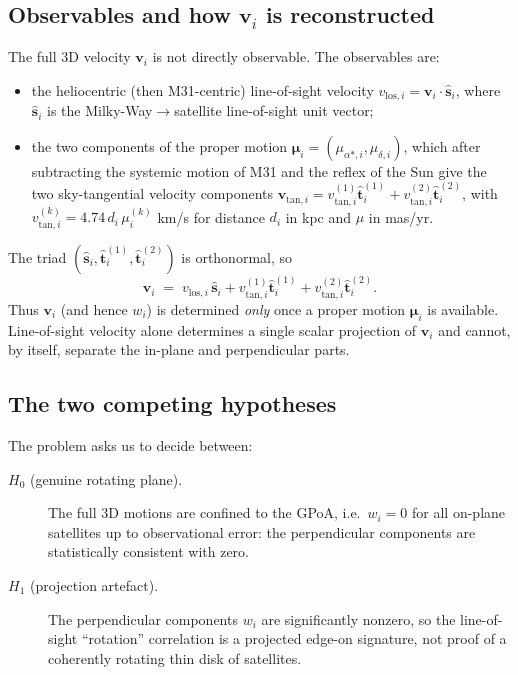 \documentclass{amsart}
\theoremstyle{definition}
\begin{document}
\subsection{Observables and how $\bm v_i$ is reconstructed}
The full 3D velocity $\bm v_i$ is not directly observable. The observables are:
\begin{itemize}
  \item the heliocentric (then M31-centric) line-of-sight velocity
        $v_{\mathrm{los},i}=\bm v_i\cdot\hat{\bm s}_i$, where $\hat{\bm s}_i$
        is the Milky-Way$\to$satellite line-of-sight unit vector;
  \item the two components of the proper motion
        $\bm\mu_i=(\mu_{\alpha*,i},\mu_{\delta,i})$, which after subtracting
        the systemic motion of M31 and the reflex of the Sun give the two
        sky-tangential velocity components
        $\bm v_{\mathrm{tan},i}=v_{\mathrm{tan},i}^{(1)}\hat{\bm t}_i^{(1)}
        + v_{\mathrm{tan},i}^{(2)}\hat{\bm t}_i^{(2)}$, with
        $v_{\mathrm{tan},i}^{(k)} = 4.74\,d_i\,\mu^{(k)}_i$ km/s for distance
        $d_i$ in kpc and $\mu$ in mas/yr.
\end{itemize}
The triad $(\hat{\bm s}_i,\hat{\bm t}_i^{(1)},\hat{\bm t}_i^{(2)})$ is
orthonormal, so
\begin{equation}\label{eq:v3d}
  \bm v_i \;=\; v_{\mathrm{los},i}\,\hat{\bm s}_i
   + v_{\mathrm{tan},i}^{(1)}\hat{\bm t}_i^{(1)}
   + v_{\mathrm{tan},i}^{(2)}\hat{\bm t}_i^{(2)} .
\end{equation}
Thus $\bm v_i$ (and hence $w_i$) is determined \emph{only} once a proper
motion $\bm\mu_i$ is available. Line-of-sight velocity alone determines a
single scalar projection of $\bm v_i$ and cannot, by itself, separate the
in-plane and perpendicular parts.

\subsection{The two competing hypotheses}
The problem asks us to decide between:
\begin{description}
\item[$H_0$ (genuine rotating plane).] The full 3D motions are confined to
  the GPoA, i.e.\ $w_i=0$ for all on-plane satellites up to observational
  error: the perpendicular components are statistically consistent with zero.
\item[$H_1$ (projection artefact).] The perpendicular components $w_i$ are
  significantly nonzero, so the line-of-sight ``rotation'' correlation is a
  projected edge-on signature, not proof of a coherently rotating
  thin disk of satellites.
\end{description}
\end{document}
